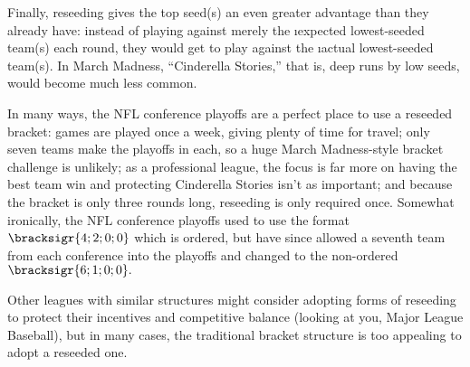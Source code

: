 {Finally, reseeding gives the top seed(s) an even greater advantage than they already have: instead of playing against merely the \i{expected} lowest-seeded team(s) each round, they would get to play against the \i{actual} lowest-seeded team(s). In March Madness, ``Cinderella Stories,'' that is, deep runs by low seeds, would become much less common.

In many ways, the NFL conference playoffs are a perfect place to use a reseeded bracket: games are played once a week, giving plenty of time for travel; only seven teams make the playoffs in each, so a huge March Madness-style bracket challenge is unlikely; as a professional league, the focus is far more on having the best team win and protecting Cinderella Stories isn't as important; and because the bracket is only three rounds long, reseeding is only required once. Somewhat ironically, the NFL conference playoffs used to use the format $\bracksigr{4;2;0;0}$ which is ordered, but have since allowed a seventh team from each conference into the playoffs and changed to the non-ordered $\bracksigr{6;1;0;0}.$ 

Other leagues with similar structures might consider adopting forms of reseeding to protect their incentives and competitive balance (looking at you, Major League Baseball), but in many cases, the traditional bracket structure is too appealing to adopt a reseeded one.
}